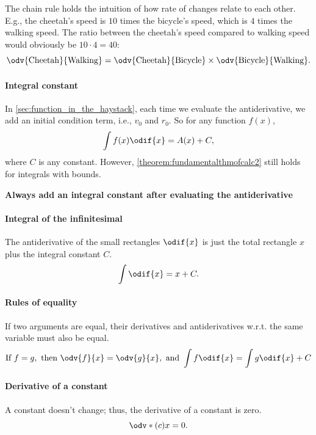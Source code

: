 The chain rule holds the intuition of how rate of changes relate to each other. E.g., the cheetah's speed is $10$ times the bicycle's speed, which is $4$ times the walking speed. The ratio between the cheetah's speed compared to walking speed would obviously be $10\cdot 4 = 40$:
\begin{equation}
	\odv{\textrm{Cheetah}}{\textrm{Walking}} = \odv{\textrm{Cheetah}}{\textrm{Bicycle}} \times \odv{\textrm{Bicycle}}{\textrm{Walking}}.
\end{equation}

\paragraph{Integral constant} In \cref{sec:function_in_the_haystack}, each time we evaluate the antiderivative, we add an initial condition term, i.e., $v_0$ and $r_0$. So for any function $f(x)$,
\begin{equation}
	\int f(x)\odif{x} = A(x) + C,
\end{equation}
where $C$ is any constant. However, \cref{theorem:fundamentalthmofcalc2} still holds for integrals with bounds.
\begin{center}
	\textbf{
		\large Always add an integral constant after evaluating the antiderivative
	}
\end{center}

\paragraph{Integral of the infinitesimal} The antiderivative of the small rectangles $\odif{x}$ is just the total rectangle $x$ plus the integral constant $C$. 
\begin{equation}
	\int \odif{x} = x + C.
\end{equation}

\paragraph{Rules of equality} If two arguments are equal, their derivatives and antiderivatives w.r.t. the same variable must also be equal.
\begin{equation*}
	\textrm{If}~f = g,\textrm{ then }\odv{f}{x} = \odv{g}{x},\textrm{ and }\int f\odif{x} = \int g\odif{x} + C
\end{equation*}

\paragraph{Derivative of a constant} A constant doesn't change; thus, the derivative of a constant is zero. 
\begin{equation}
	\odv*{(c)}{x} = 0.
\end{equation}

